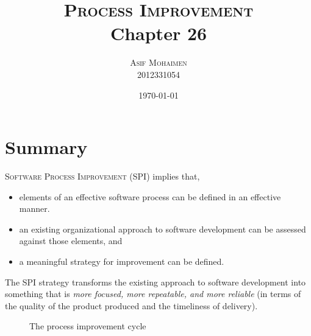 \documentclass[dvips,12pt]{article}
\begin{document}
\title{
  \textsc{Process Improvement}\\
  Chapter 26
}
\author{
  \textsc{Asif Mohaimen}\\
  2012331054\\
}
\date{\today}

\maketitle


\section*{Summary}
\textsc{Software Process Improvement} (SPI) implies that, 
\begin{itemize}
\item elements of an effective software process can be defined in an effective manner.
\item an existing organizational approach to software development can be assessed against those elements, and
\item a meaningful strategy for improvement can be defined.
\end{itemize}
The SPI strategy transforms the existing approach to software development into something that is \emph{more focused, more repeatable, and more reliable} (in terms of the quality of the product produced and the timeliness of delivery).

\begin{figure}[b]
\begin{center}
\end{center} 
\caption{The process improvement cycle\label{ch261}}
\end{figure}
\end{document}
